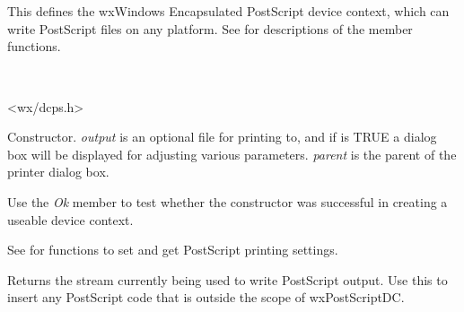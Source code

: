 \section{}\label{wxpostscriptdc}

This defines the wxWindows Encapsulated PostScript device context,
which can write PostScript files on any platform. See  for
descriptions of the member functions.


\\


<wx/dcps.h>



Constructor. {\it output} is an optional file for printing to, and if
 is TRUE a dialog box will be displayed for adjusting
various parameters. {\it parent} is the parent of the printer dialog box.

Use the {\it Ok} member to test whether the constructor was successful
in creating a useable device context.

See  for functions to set and
get PostScript printing settings.



Returns the stream currently being used to write PostScript output. Use this
to insert any PostScript code that is outside the scope of wxPostScriptDC.


